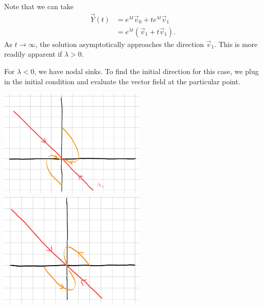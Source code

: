 \documentclass[10pt]{mypackage}
\begin{document}
\begin{example}
  Note that we can take
  \begin{align*}
    \vec{Y}(t) &= e^{\lambda t}\vec{v}_0 + te^{\lambda t}\vec{v}_1\\
               &= e^{\lambda t}\left(\vec{v}_1 + t\vec{v}_1\right).
  \end{align*}
  As $t\rightarrow\infty$, the solution asymptotically approaches the direction $\vec{v}_1$. This is more readily apparent if $\lambda > 0$.\newline

  For $\lambda < 0$, we have nodal sinks. To find the initial direction for this case, we plug in the initial condition and evaluate the vector field at the particular point.
  \begin{center}
    \includegraphics[width=7cm]{images/nodal_sink_1.png}\break
    \includegraphics[width=7cm]{images/nodal_sink_2.png}
  \end{center}
\end{example}
\end{document}
